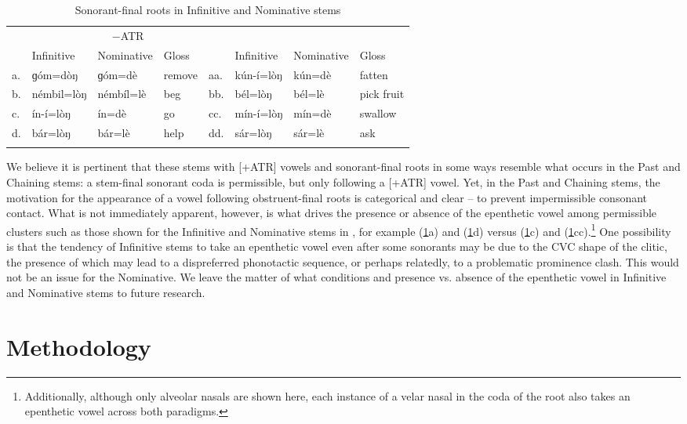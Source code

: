 \documentclass[output=paper,colorlinks,citecolor=brown]{langscibook}
\begin{document}
\begin{table}
\small
\caption{Sonorant-final roots in Infinitive and Nominative stems}
\label{tab:inf-nom:VS}
\begin{tabular}{l@{~~}lll l@{~~}lll} 
\lsptoprule
\multicolumn{4}{c}{+ATR}&\multicolumn{4}{c}{−ATR}\\\cmidrule(lr){1-4}\cmidrule(lr){5-8}
& Infinitive & Nominative & Gloss & & Infinitive & Nominative & Gloss \\\midrule
a.	&	ɡóm=dòŋ	&	ɡóm=dè	&	remove	&	aa.	&	kún-í=lòŋ	&	kún=dè	&	fatten	\\
b.	&	némbil=lòŋ  	&	némbíl=lè	&	beg	&	bb.	&	bél=lòŋ	&	bél=lè	&	pick fruit	\\
c.	&	ín-í=lòŋ	&	ín=dè	&	go	&	cc.	&	mín-í=lòŋ	&	mín=dè	&	swallow	\\
d.	&	bár=lòŋ	&	bár=lè	&	help	&	dd.	&	sár=lòŋ	&	sár=lè	&	ask	\\
\lspbottomrule
\end{tabular}
\end{table}

We believe it is pertinent that these stems with [+ATR] vowels and sonorant-final roots in some ways resemble what occurs in the Past and Chaining stems: a stem-final sonorant coda is permissible, but only following a [+ATR] vowel. Yet, in the Past and Chaining stems, the motivation for the appearance of a vowel following obstruent-final roots is categorical and clear -- to prevent impermissible consonant contact. What is not immediately apparent, however, is what drives the presence or absence of the epenthetic vowel among permissible clusters  such as those shown for the Infinitive and Nominative stems in , for example (\ref{tab:inf-nom:VS}a) and (\ref{tab:inf-nom:VS}d) versus (\ref{tab:inf-nom:VS}c) and (\ref{tab:inf-nom:VS}cc).\footnote{Additionally, although only alveolar nasals are shown here, each instance of a velar nasal in the coda of the root also takes an epenthetic vowel across both paradigms.} One possibility is that the tendency of Infinitive stems to take an epenthetic vowel even after some sonorants may be due to the CVC shape of the clitic, the presence of which may lead to a dispreferred phonotactic sequence, or perhaps relatedly, to a problematic prominence clash. This would not be an issue for the Nominative. We leave the matter of what conditions and presence vs. absence of the epenthetic vowel in Infinitive and Nominative stems to future research. 

\section{Methodology}
\label{sec-meth}
\end{document}
